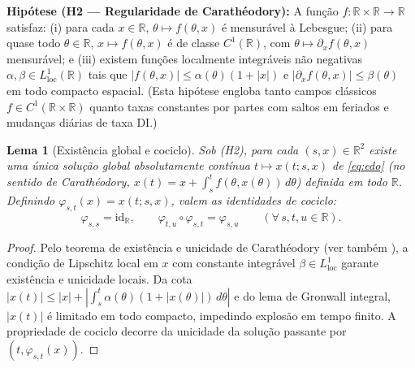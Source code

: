 \documentclass[11pt, a4paper]{article}
\theoremstyle{definition}
\theoremstyle{plain}
\newtheorem{lema}[definicao]{Lema}
\theoremstyle{remark}
\begin{document}
\noindent\textbf{Hipótese (H2 — Regularidade de Carathéodory):} A função $f : \mathbb{R} \times \mathbb{R} \to \mathbb{R}$ satisfaz: (i) para cada $x \in \mathbb{R}$, $\theta \mapsto f(\theta, x)$ é mensurável à Lebesgue; (ii) para quase todo $\theta \in \mathbb{R}$, $x \mapsto f(\theta, x)$ é de classe $C^1(\mathbb{R})$, com $\theta \mapsto \partial_x f(\theta, x)$ mensurável; e (iii) existem funções localmente integráveis não negativas $\alpha, \beta \in L^1_{\text{loc}}(\mathbb{R})$ tais que $|f(\theta, x)| \le \alpha(\theta)(1 + |x|)$ e $|\partial_x f(\theta, x)| \le \beta(\theta)$ em todo compacto espacial. (Esta hipótese engloba tanto campos clássicos $f \in C^1(\mathbb{R} \times \mathbb{R})$ quanto taxas constantes por partes com saltos em feriados e mudanças diárias de taxa DI.)

\begin{lema}[Existência global e cociclo]\label{lem:3.1}
Sob (H2), para cada $(s, x) \in \mathbb{R}^2$ existe uma única solução global absolutamente contínua $t \mapsto x(t; s, x)$ de \eqref{eq:edo} (no sentido de Carathéodory, $x(t) = x + \int_s^t f(\theta, x(\theta))\,d\theta$) definida em todo $\mathbb{R}$. Definindo $\varphi_{s,t}(x) = x(t; s, x)$, valem as identidades de cociclo:
\[
\varphi_{s,s} = \mathrm{id}_{\mathbb{R}}, \qquad \varphi_{t,u} \circ \varphi_{s,t} = \varphi_{s,u} \qquad (\forall\, s, t, u \in \mathbb{R}).
\]
\end{lema}
\begin{proof}
Pelo teorema de existência e unicidade de Carathéodory \cite[Cap.~2]{CoddingtonLevinson1955} (ver também \cite{Hartman2002, HirschSmaleDevaney2013, Sotomayor1979}), a condição de Lipschitz local em $x$ com constante integrável $\beta \in L^1_{\text{loc}}$ garante existência e unicidade locais. Da cota $|x(t)| \le |x| + \left|\int_s^t \alpha(\theta)(1 + |x(\theta)|)\,d\theta\right|$ e do lema de Gronwall integral, $|x(t)|$ é limitado em todo compacto, impedindo explosão em tempo finito. A propriedade de cociclo decorre da unicidade da solução passante por $(t, \varphi_{s,t}(x))$.
\end{proof}
\end{document}
